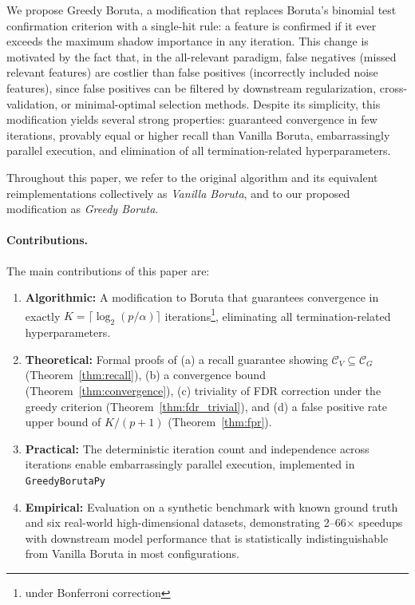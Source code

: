 \documentclass[runningheads]{llncs}
\begin{document}
We propose Greedy Boruta, a modification that replaces Boruta's binomial test confirmation criterion with a single-hit rule: a feature is confirmed if it ever exceeds the maximum shadow importance in any iteration. This change is motivated by the fact that, in the all-relevant paradigm, false negatives (missed relevant features) are costlier than false positives (incorrectly included noise features), since false positives can be filtered by downstream regularization, cross-validation, or minimal-optimal selection methods. Despite its simplicity, this modification yields several strong properties: guaranteed convergence in few iterations, provably equal or higher recall than Vanilla Boruta, embarrassingly parallel execution, and elimination of all termination-related hyperparameters.

Throughout this paper, we refer to the original algorithm and its equivalent reimplementations collectively as \emph{Vanilla Boruta}, and to our proposed modification as \emph{Greedy Boruta}.

\paragraph{Contributions.} The main contributions of this paper are:
\begin{enumerate}
    \item \textbf{Algorithmic:} A modification to Boruta that guarantees convergence in exactly $K = \lceil \log_2(p/\alpha) \rceil$ iterations\footnote{\label{fn:bonf}under Bonferroni correction}, eliminating all termination-related hyperparameters.
    \item \textbf{Theoretical:} Formal proofs of (a) a recall guarantee showing $\mathcal{C}_V \subseteq \mathcal{C}_G$ (Theorem~\ref{thm:recall}), (b) a convergence bound (Theorem~\ref{thm:convergence}), (c) triviality of FDR correction under the greedy criterion (Theorem~\ref{thm:fdr_trivial}), and (d) a false positive rate upper bound of $K/(p+1)$ (Theorem~\ref{thm:fpr}).
    \item \textbf{Practical:} The deterministic iteration count and independence across iterations enable embarrassingly parallel execution, implemented in \texttt{GreedyBorutaPy}
    \item \textbf{Empirical:} Evaluation on a synthetic benchmark with known ground truth and six real-world high-dimensional datasets, demonstrating 2--66$\times$ speedups with downstream model performance that is statistically indistinguishable from Vanilla Boruta in most configurations.
\end{enumerate}
\end{document}
